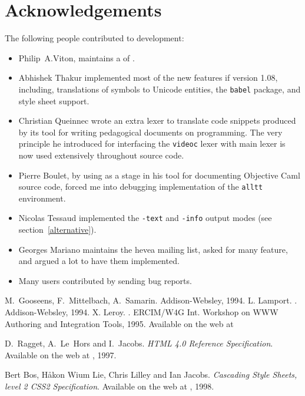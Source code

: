 \section{Acknowledgements}
The following people contributed to \hevea{} development:
\begin{itemize}
\item Philip~A.Viton, maintains a
 of \hevea.
\item Abhishek Thakur implemented most of the new features if version
1.08, including, translations of symbols to Unicode entities,
the  \texttt{babel} package, and style sheet support.
\item Christian Queinnec wrote an extra lexer to translate code
snippets produced by its tool
for writing pedagogical documents on programming.
The very principle he introduced for interfacing the \texttt{videoc}
lexer with \hevea{} main lexer is now used extensively throughout
\hevea{} source code.
\item Pierre Boulet, by using \hevea{} as a stage in his tool
for documenting Objective Caml source code, forced me into debugging
\hevea{} implementation of the \verb+alltt+ environment.
\item Nicolas Tessaud implemented the \verb+-text+ and \verb+-info+
output modes (see section~\ref{alternative}).
\item Georges Mariano maintains the hevea mailing list, asked for
many feature, and argued a lot to have them implemented.
\item Many users contributed by sending bug reports.
\end{itemize}

\begin{thebibliography}{xxxxxxxxxx}
M.~Gooseens, F.~Mittelbach, A.~Samarin.
\newblock Addison-Websley, 1994.
L. Lamport.
.
\newblock Addison-Websley, 1994.
X. Leroy.
.
\newblock ERCIM/W4G Int. Workshop on WWW Authoring and Integration
Tools, 1995.
\newblock Available on the web at

D.~Ragget, A.~Le~Hors and I.~Jacobs.
{\em HTML 4.0 Reference Specification}. Available on the web at
, 1997.

Bert Bos,  H{\aa}kon Wium Lie,
Chris Lilley and Ian Jacobs.
{\em Cascading Style Sheets, level 2 CSS2 Specification}. Available on
the web at
, 1998.

\end{thebibliography}
\printindex
\cutend

